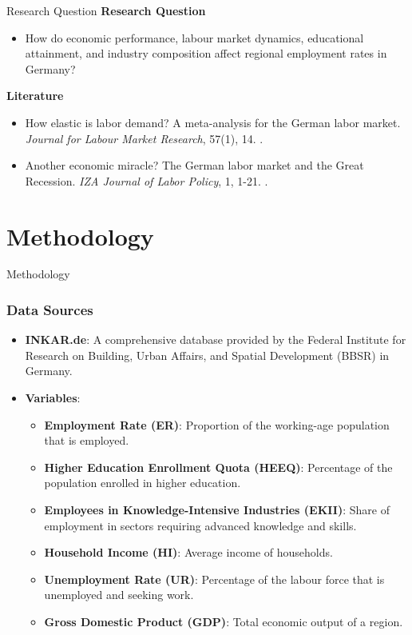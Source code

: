 \documentclass[10pt]{beamer}
\begin{document}
\begin{frame}{Research Question}
    \setlength{\parskip}{1em}
    \textbf{Research Question}
    \begin{itemize}
        \item \textbf{} How do economic performance, labour market dynamics, educational attainment, and industry composition affect regional employment rates in Germany?
    \end{itemize}

    \textbf{Literature}
    \begin{itemize}
         \item How elastic is labor demand? A meta-analysis for the German labor market. \textit{Journal for Labour Market Research}, 57(1), 14. \parencite{Popp2023}.
         \item Another economic miracle? The German labor market and the Great Recession. \textit{IZA Journal of Labor Policy}, 1, 1-21. \parencite{RinneZimmermann2012}.
    \end{itemize}
\end{frame}


\section{Methodology}
\begin{frame}{Methodology}
\frametitle{Data Sources}
    \setlength{\parskip}{1em}
    \begin{itemize}
        \item \textbf{INKAR.de}: A comprehensive database provided by the Federal Institute for Research on Building, Urban Affairs, and Spatial Development (BBSR) in Germany. 
        \item \textbf{Variables}:
        \begin{itemize}
            \item \textbf{Employment Rate (ER)}: Proportion of the working-age population that is employed.
            \item \textbf{Higher Education Enrollment Quota (HEEQ)}: Percentage of the population enrolled in higher education.
            \item \textbf{Employees in Knowledge-Intensive Industries (EKII)}: Share of employment in sectors requiring advanced knowledge and skills.
            \item \textbf{Household Income (HI)}: Average income of households.
            \item \textbf{Unemployment Rate (UR)}: Percentage of the labour force that is unemployed and seeking work.
            \item \textbf{Gross Domestic Product (GDP)}: Total economic output of a region.
        \end{itemize}
    \end{itemize}
\end{frame}
\end{document}
